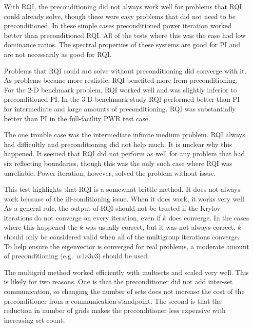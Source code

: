 
With RQI, the preconditioning did not always work well for problems that RQI could already solve, though these were easy problems that did not need to be preconditioned. In these simple cases preconditioned power iteration worked better than preconditioned RQI. All of the tests where this was the case had low dominance ratios. The spectral properties of these systems are good for PI and are not necessarily as good for RQI.

Problems that RQI could not solve without preconditioning did converge with it. As problems became more realistic, RQI benefited more from preconditioning. For the 2-D benchmark problem, RQI worked well and was slightly inferior to preconditioned PI. In the 3-D benchmark study RQI performed better than PI for intermediate and large amounts of preconditioning. RQI was substantially better than PI in the full-facility PWR test case.

The one trouble case was the intermediate infinite medium problem. RQI always had difficultly and preconditioning did not help much. It is unclear why this happened. It seemed that RQI did not perform as well for any problem that had six reflecting boundaries, though this was the only such case where RQI was unreliable. Power iteration, however, solved the problem without issue. 

This test highlights that RQI is a somewhat brittle method. It does not always work because of the ill-conditioning issue. When it does work, it works very well. As a general rule, the output of RQI should not be trusted if the Krylov iterations do not converge on every iteration, even if $k$ does converge. In the cases where this happened the $k$ was usually correct, but it was not always correct. $k$ should only be considered valid when all of the multigroup iterations converge. To help ensure the eigenvector is converged for real problems, a moderate amount of preconditioning (e.g.\ $w1r3v3$) should be used. 

The multigrid method worked efficiently with multisets and scaled very well. This is likely for two reasons. One is that the preconditioner did not add inter-set communication, so changing the number of sets does not increase the cost of the preconditioner from a communication standpoint. The second is that the reduction in number of grids makes the preconditioner less expensive with increasing set count. 


